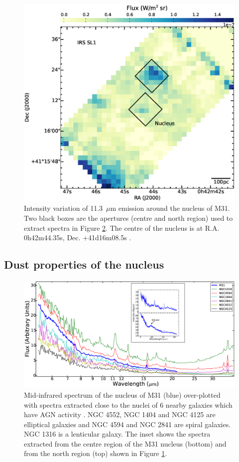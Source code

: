 \begin{figure}
\centering
\includegraphics[width = 8 cm]{./nuc11_3.eps}
\caption{ Intensity variation of 11.3~$\mu$m emission around the nucleus of M31. 
Two black boxes are the apertures (centre and north region) used to extract spectra in Figure \ref{smithspec}. 
The centre of the nucleus is at R.A. 0h42m44.35s, Dec. +41d16m08.5s \citep{NucleusREF}.}
\label{nuc11}
\end{figure}

\subsection{Dust properties of the nucleus}
\label{sect:nucleus}

\begin{figure}
\centering
\includegraphics[height = 8 cm]{./SINGSspec.eps}
\caption{Mid-infrared spectrum of the nucleus of M31 (blue) over-plotted with spectra extracted close to the nuclei of 6 nearby galaxies which have 
AGN activity \citep{Smith:2007lr}. NGC 4552, NGC 1404 and NGC 4125 are elliptical galaxies and NGC 4594 and NGC 2841 are spiral galaxies. 
NGC 1316 is a lenticular galaxy. The inset shows the spectra extracted from the centre region of the M31 nucleus (bottom) and from the north region (top) 
shown in Figure \ref{nuc11}.}
\label{smithspec}
\end{figure}

